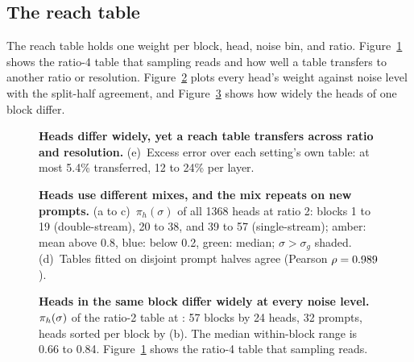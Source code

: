 \subsection{The reach table}
\label{app:emu_table}

The reach table holds one weight per block, head, noise bin, and ratio. Figure~\ref{fig:reach_tables} shows the ratio-4 table that sampling reads and how well a table transfers to another ratio or resolution. Figure~\ref{fig:pi_heads} plots every head's weight against noise level with the split-half agreement, and Figure~\ref{fig:heatmap} shows how widely the heads of one block differ.

\begin{figure}[!htbp]
  \centering
  \caption{\textbf{Heads differ widely, yet a reach table transfers across ratio and resolution.}  (e)~Excess error over each setting's own table: at most 5.4\% transferred, 12 to 24\% per layer.}
  \label{fig:reach_tables}
\end{figure}

\begin{figure}[!htbp]
  \centering
  \caption{\textbf{Heads use different mixes, and the mix repeats on new prompts.} (a to c)~$\pi_h(\sigma)$ of all 1368 heads at ratio 2: blocks 1 to 19 (double-stream), 20 to 38, and 39 to 57 (single-stream); amber: mean above 0.8, blue: below 0.2, green: median; $\sigma>\sigma_g$ shaded. (d)~Tables fitted on disjoint prompt halves agree (Pearson $\rho=\ifdefined\hlEmuSplitHalfTwo\hlEmuSplitHalfTwo\else0.989\fi$).}
  \label{fig:pi_heads}
\end{figure}

\begin{figure}[!htbp]
  \centering
  \caption{\textbf{Heads in the same block differ widely at every noise level.} $\pi_{h}(\sigma)$ of the ratio-2 table at : 57 blocks by 24 heads, 32 prompts, heads sorted per block by (b). The median within-block range is 0.66 to 0.84. Figure~\ref{fig:reach_tables} shows the ratio-4 table that sampling reads.}
  \label{fig:heatmap}
\end{figure}


